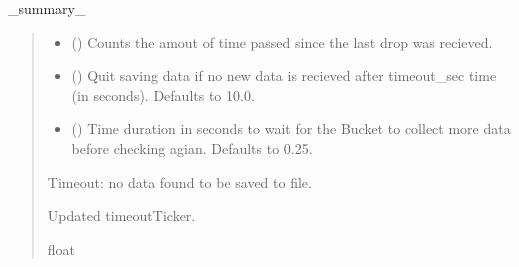 \documentclass[letterpaper,10pt,english]{sphinxmanual}
\begin{document}
\begin{fulllineitems}
\begin{fulllineitems}
\label{\detokenize{PodApi.Stream:PodApi.Stream.DrainToFile.DrainBucket._DrainDropToFile}}
\pysigstartsignatures
{}
\pysigstopsignatures
\sphinxAtStartPar
\_summary\_
\begin{quote}\begin{description}
\begin{itemize}
\item {} 
\sphinxAtStartPar
{} () \textendash{} Counts the amout of time passed since the last drop was recieved.

\item {} 
\sphinxAtStartPar
{} (\sphinxstyleliteralemphasis{\sphinxupquote{, }}) \textendash{} Quit saving data if no new data is recieved                 after timeout\_sec time (in seconds). Defaults to 10.0.

\item {} 
\sphinxAtStartPar
{} (\sphinxstyleliteralemphasis{\sphinxupquote{, }}) \textendash{} Time duration in seconds to wait for the Bucket to                 collect more data before checking agian. Defaults to 0.25.

\end{itemize}

\sphinxAtStartPar
{} \textendash{} Timeout: no data found to be saved to file.

\sphinxAtStartPar
Updated timeoutTicker.

\sphinxAtStartPar
float


\end{description}
\end{quote}
\end{fulllineitems}
\end{fulllineitems}
\end{document}
